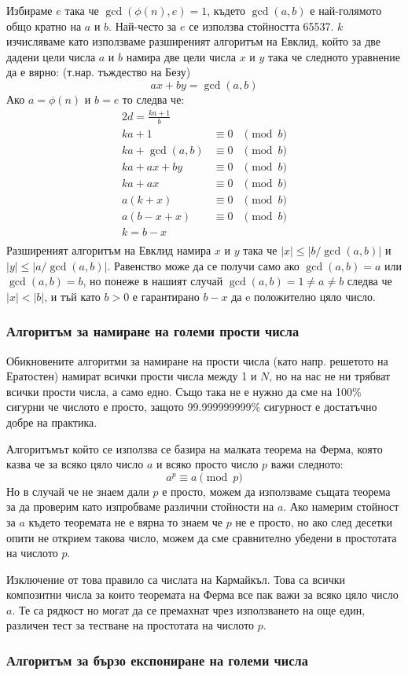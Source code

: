 Избираме $e$ така че $\gcd(\phi(n), e) = 1$, където $\gcd(a,b)$ е най-голямото общо кратно на $a$ и $b$. Най-често за $e$ се използва стойността 65537. $k$ изчисляваме като използваме разширеният алгоритъм на Евклид, който за две дадени цели числа $a$ и $b$ намира две цели числа $x$ и $y$ така че следното уравнение да е вярно: (т.нар. тъждество на Безу)
$$ ax + by = \gcd(a,b) $$
Ако $a = \phi(n)$ и $b = e$ то следва че:
\begin{alignat*}{2}
d = \frac{ka+1}{b} \\
ka + 1 &\equiv 0 &\pmod b \\
ka + \gcd(a,b) &\equiv 0 &\pmod b \\
ka + ax + by &\equiv 0 &\pmod b \\
ka + ax &\equiv 0 &\pmod b \\
a(k+x) &\equiv 0 &\pmod b \\
a(b-x+x) &\equiv 0 &\pmod b \\
k = b-x \\
\end{alignat*}
Разширеният алгоритъм на Евклид намира $x$ и $y$ така че $|x|\leq|b/\gcd(a,b)|$ и $|y|\leq|a/\gcd(a,b)|$. Равенство може да се получи само ако $\gcd(a,b)=a$ или $\gcd(a,b)=b$, но понеже в нашият случай $\gcd(a,b)=1\neq a\neq b$ следва че $|x|<|b|$, и тъй като $b>0$ е гарантирано $b-x$ да e положително цяло число.

\subsubsection{Алгоритъм за намиране на големи прости числа} \label{fermatprimes}
Обикновените алгоритми за намиране на прости числа (като напр. решетото на Ератостен) намират всички прости числа между 1 и $N$, но на нас не ни трябват всички прости числа, а само едно. Също така не е нужно да сме на 100\% сигурни че числото е просто, защото 99.999999999\% сигурност е достатъчно добре на практика.

Алгоритъмът който се използва се базира на малката теорема на Ферма, която казва че за всяко цяло число $a$ и всяко просто число $p$ важи следното:
$$ a^p \equiv a \pmod p $$
Но в случай че не знаем дали $p$ е просто, можем да използваме същата теорема за да проверим като изпробваме различни стойности на $a$. Ако намерим стойност за $a$ където теоремата не е вярна то знаем че $p$ не е просто, но ако след десетки опити не открием такова число, можем да сме сравнително убедени в простотата на числото $p$.

Изключение от това правило са числата на Кармайкъл. Това са всички композитни числа за които теоремата на Ферма все пак важи за всяко цяло число $a$. Те са рядкост но могат да се премахнат чрез използването на още един, различен тест за тестване на простотата на числото $p$.

\subsubsection{Алгоритъм за бързо експониране на големи числа}
